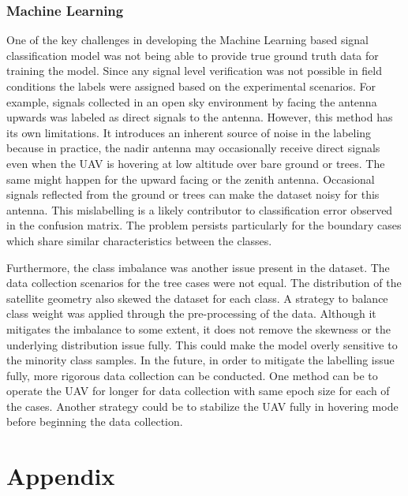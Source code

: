 \documentclass[12pt, a4paper]{article}
\begin{document}
\subsubsection{Machine Learning}
One of the key challenges in developing the Machine Learning based signal classification model was not being able to provide true
ground truth data for training the model. Since any signal level verification was not possible in field conditions the labels were assigned based 
on the experimental scenarios. For example, signals collected in an open sky environment by facing the antenna upwards was labeled as direct signals to the antenna.
However, this method has its own limitations. It introduces an inherent source of noise in the labeling because in practice, the nadir antenna may occasionally receive direct signals
even when the UAV is hovering at low altitude over bare ground or trees. The same might happen for the upward facing or the zenith antenna. Occasional signals reflected from the ground or trees
can make the dataset noisy for this antenna. This mislabelling is a likely contributor to classification error observed in the confusion matrix. The problem persists particularly
for the boundary cases which share similar characteristics between the classes. 

Furthermore, the class imbalance was another issue present in the dataset. The data collection scenarios for the tree cases were not equal. The distribution of the satellite geometry also
skewed the dataset for each class. A strategy to balance class weight was applied through the pre-processing of the data. Although it mitigates the imbalance to some extent, it does not
remove the skewness or the underlying distribution issue fully. This could make the model overly sensitive to the minority class samples. In the future, in order to mitigate the labelling issue
fully, more rigorous data collection can be conducted. One method can be to operate the UAV for longer for data collection with same epoch size for each of the cases. Another strategy could
be to stabilize the UAV fully in hovering mode before beginning the data collection. 


\newpage
{}
\section*{Appendix}
\end{document}
